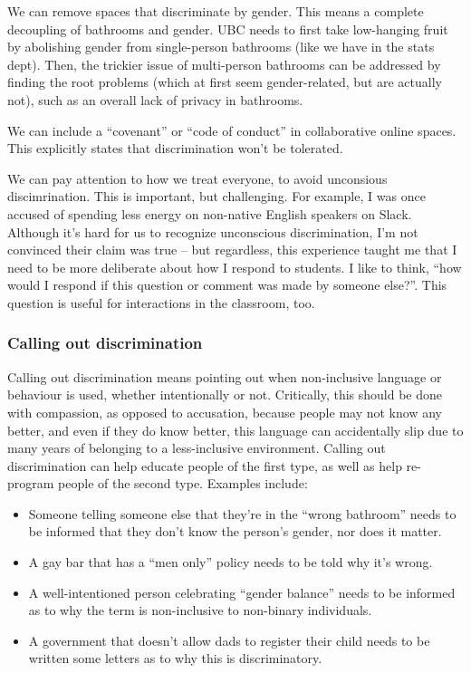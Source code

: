 \documentclass[]{article}
\providecommand{\tightlist}{%
  \setlength{\itemsep}{0pt}\setlength{\parskip}{0pt}}
\begin{document}
We can remove spaces that discriminate by gender. This means a complete decoupling of bathrooms and gender. UBC needs to first take low-hanging fruit by abolishing gender from single-person bathrooms (like we have in the stats dept). Then, the trickier issue of multi-person bathrooms can be addressed by finding the root problems (which at first seem gender-related, but are actually not), such as an overall lack of privacy in bathrooms.

We can include a ``covenant'' or ``code of conduct'' in collaborative online spaces. This explicitly states that discrimination won't be tolerated.

We can pay attention to how we treat everyone, to avoid unconsious discimrination. This is important, but challenging. For example, I was once accused of spending less energy on non-native English speakers on Slack. Although it's hard for us to recognize unconscious discrimination, I'm not convinced their claim was true -- but regardless, this experience taught me that I need to be more deliberate about how I respond to students. I like to think, ``how would I respond if this question or comment was made by someone else?''. This question is useful for interactions in the classroom, too.

\hypertarget{calling-out-discrimination}{%
\subsubsection{Calling out discrimination}\label{calling-out-discrimination}}

Calling out discrimination means pointing out when non-inclusive language or behaviour is used, whether intentionally or not. Critically, this should be done with compassion, as opposed to accusation, because people may not know any better, and even if they do know better, this language can accidentally slip due to many years of belonging to a less-inclusive environment. Calling out discrimination can help educate people of the first type, as well as help re-program people of the second type. Examples include:

\begin{itemize}
\tightlist
\item
  Someone telling someone else that they're in the ``wrong bathroom'' needs to be informed that they don't know the person's gender, nor does it matter.
\item
  A gay bar that has a ``men only'' policy needs to be told why it's wrong.
\item
  A well-intentioned person celebrating ``gender balance'' needs to be informed as to why the term is non-inclusive to non-binary individuals.
\item
  A government that doesn't allow dads to register their child needs to be written some letters as to why this is discriminatory.
\end{itemize}
\end{document}
